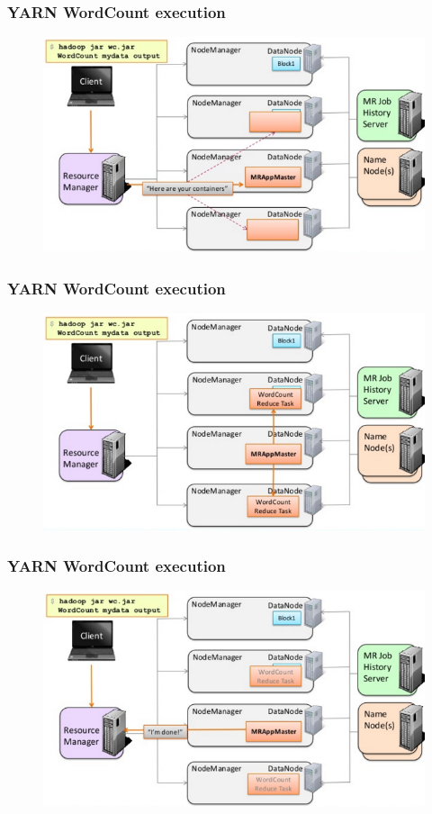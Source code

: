 \begin{frame}
\frametitle{YARN WordCount execution}
\begin{figure}[h]
  \centering
  \includegraphics[scale=0.4]{./figures/yarn_wc8}
  \label{fig:yarn_wc8}
\end{figure}
\end{frame}

\begin{frame}
\frametitle{YARN WordCount execution}
\begin{figure}[h]
  \centering
  \includegraphics[scale=0.4]{./figures/yarn_wc9}
  \label{fig:yarn_wc9}
\end{figure}
\end{frame}

\begin{frame}
\frametitle{YARN WordCount execution}
\begin{figure}[h]
  \centering
  \includegraphics[scale=0.4]{./figures/yarn_wc10}
  \label{fig:yarn_wc10}
\end{figure}
\end{frame}

